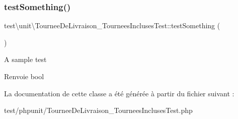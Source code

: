 \subsubsection{\texorpdfstring{test\+Something()}{testSomething()}}
{\footnotesize\ttfamily test\textbackslash{}unit\textbackslash{}\+Tournee\+De\+Livraison\+\_\+\+Tournees\+Incluses\+Test\+::test\+Something (\begin{DoxyParamCaption}{ }\end{DoxyParamCaption})}

A sample test \begin{DoxyReturn}{Renvoie}
bool 
\end{DoxyReturn}


La documentation de cette classe a été générée à partir du fichier suivant \+:\begin{DoxyCompactItemize}
\item 
test/phpunit/Tournee\+De\+Livraison\+\_\+\+Tournees\+Incluses\+Test.\+php\end{DoxyCompactItemize}
